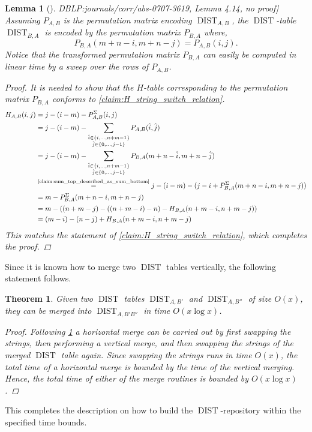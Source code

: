\documentclass[twoside,11pt,openright]{report}
\newcommand{\DIST}{\operatorname{DIST}}
\newcommand{\refbook}[2]{\cite[#1]{DBLP:journals/corr/abs-0707-3619}, #2}
\newtheorem{lemma}{Lemma}
\newtheorem{theorem}{Theorem}
\begin{document}
\begin{lemma}[\refbook{p.-52}{Lemma 4.14, no proof}]
  \label{lemma:swap_strings}
  Assuming $P_{A,B}$ is the permutation matrix encoding $\DIST_{A,B}$, the $\DIST$-table $\DIST_{B,A}$ is encoded by the permutation matrix $P_{B,A}$ where,
  \[
    P_{B,A}(m + n - i, m + n - j) = P_{A,B}(i, j).
  \]
  Notice that the transformed permutation matrix $P_{B,A}$ can easily be computed in linear time by a sweep over the rows of $P_{A,B}$.
  \begin{proof}
    It is needed to show that the $H$-table corresponding to the permutation matrix $P_{B,A}$ conforms to \cref{claim:H_string_switch_relation}.
    \begin{align*}
      H_{A,B}(i, j) &= j - (i - m) - P_{A,B}^{\Sigma}(i, j) \\
        &= j - (i - m) - \sum_{\substack{ \hat{i} \in \{i,\dots,n+m - 1\} \\ \hat{j} \in \{0, \dots, j - 1\}}} P_{A,B}(\hat{i}, \hat{j}) \\
        &= j - (i - m) - \sum_{\substack{ \hat{i} \in \{i, \dots, n + m - 1\} \\ \hat{j} \in \{ 0, \dots, j - 1 \}}} P_{B,A}(m + n - \hat{i}, m + n - \hat{j}) \\
        &\overset{\text{\cref{claim:sum_top_described_as_sum_bottom}}}{=} j - (i - m) - (j - i + P_{B,A}^{\Sigma}(m + n - i, m + n - j)) \\
        &= m - P_{B,A}^{\Sigma}(m + n - i, m + n - j) \\
        &= m - \left( (n + m - j) - ((n + m - i) - n) - H_{B,A}(n + m - i, n + m - j) \right) \\
        &= (m - i) - (n - j) + H_{B,A}(n + m - i, n + m - j)
    \end{align*}
    This matches the statement of \cref{claim:H_string_switch_relation}, which completes the proof.
  \end{proof}
\end{lemma}
%
Since it is known how to merge two $\DIST$ tables vertically, the following statement follows.
\begin{theorem}
  \label{thm:dist-horizontal-merge}
  Given two $\DIST$ tables $\DIST_{A,B'}$ and $\DIST_{A,B''}$ of size $O(x)$, they can be merged into $\DIST_{A,B'B''}$ in time $O(x\log{x})$.
  \begin{proof}
    Following \cref{lemma:swap_strings} a horizontal merge can be carried out by first swapping the strings, then performing a vertical merge, and then swapping the strings of the merged $\DIST$ table again. Since swapping the strings runs in time $O(x)$, the total time of a horizontal merge is bounded by the time of the vertical merging. Hence, the total time of either of the merge routines is bounded by $O(x\log{x})$.
  \end{proof}
\end{theorem}
This completes the description on how to build the $\DIST$-repository within the specified time bounds.
\end{document}
